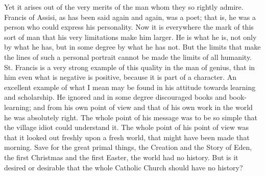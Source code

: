 \documentclass{book}
\begin{document}
Yet it arises out of the very merits of the man whom they so rightly admire. Francis of Assisi, as has been said again and again, was a poet; that is, he was a person who could express his personality. Now it is everywhere the mark of this sort of man that his very limitations make him larger. He is what he is, not only by what he has, but in some degree by what he has not. But the limits that make the lines of such a personal portrait cannot be made the limits of all humanity. St. Francis is a very strong example of this quality in the man of genius, that in him even what is negative is positive, because it is part of a character. An excellent example of what I mean may be found in his attitude towards learning and scholarship. He ignored and in some degree discouraged books and book-learning; and from his own point of view and that of his own work in the world he was absolutely right. The whole point of his message was to be so simple that the village idiot could understand it. The whole point of his point of view was that it looked out freshly upon a fresh world, that might have been made that morning. Save for the great primal things, the Creation and the Story of Eden, the first Christmas and the first Easter, the world had no history. But is it desired or desirable that the whole Catholic Church should have no history?
\end{document}
